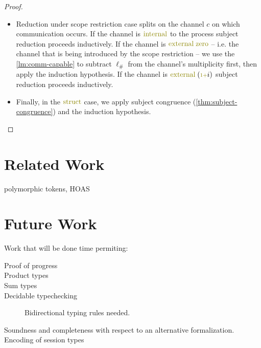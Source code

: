 \documentclass[a4paper,UKenglish,cleveref, autoref, thm-restate,authorcolumns]{lipics-v2019}
\theoremstyle{definition}
\newcommand{\constr}[1]{\textcolor{olive}{\operatorname{#1}}}
\newcommand{\suc}{\constr{\scriptstyle 1+}}
\newcommand{\lio}{\ell_{\#}}
\begin{document}
\begin{proof}
\begin{itemize}
    \item
    Reduction under scope restriction case splits on the channel $c$ on which communication occurs.
    If the channel is $\constr{internal}$ to the process subject reduction proceeds inductively.
    If the channel is $\constr{external}\; \constr{zero}$ -- i.e. the channel that is being introduced by the scope restriction -- we use the \autoref{lm:comm-capable} to subtract $\lio$ from the channel's multiplicity first, then apply the induction hypothesis.
    If the channel is $\constr{external}\; (\suc i)$ subject reduction proceeds inductively.

    \item
    Finally, in the $\constr{struct}$ case, we apply subject congruence (\autoref{thm:subject-congruence}) and the induction hypothesis.
  \end{itemize}
\end{proof}

\section{Related Work}

\cite{previous-work} polymorphic tokens, HOAS

\cite{typing-with-leftovers}

\cite{Higher-inductive-types-for-congruence}

\cite{LTS-semantics}

\cite{work-on-session-types}


\section{Future Work}

Work that will be done time permiting:

\begin{description}

\item [Proof of progress]

\item [Product types]

\item [Sum types]

\item [Decidable typechecking]

  Bidirectional typing rules needed.

\item [Soundness and completeness with respect to an alternative formalization.]

\item [Encoding of session types]

\end{description}

\newpage


\newpage
\appendix

\end{document}
